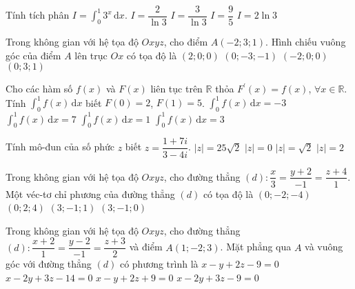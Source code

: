 \begin{ex}%
Tính tích phân $I=\displaystyle \int_{0}^{1} 3^x \mathrm{\, d}x$.
\choice
{\True $I=\dfrac{2}{\ln3}$}
{$I=\dfrac{3}{\ln3}$}
{$I=\dfrac{9}{5}$}
{$I=2\ln3$}
\end{ex}
\begin{ex}%
Trong không gian với hệ tọa độ $Oxyz$, cho điểm $A(-2;3;1)$. Hình chiếu vuông góc của điểm $A$ lên trục $Ox$ có tọa độ là
\choice
{$(2;0;0)$}
{$(0;-3;-1)$}
{\True $(-2;0;0)$}
{$(0;3;1)$}
\end{ex}
\begin{ex}%
Cho các hàm số $f(x)$ và $F(x)$ liên tục trên $\mathbb{R}$ thỏa $F^\prime (x) = f(x)$, $\forall x \in \mathbb{R}$. Tính $\displaystyle \int_{0}^{1} f(x) \mathrm{\, d}x$ biết $F(0)=2$, $F(1)=5$.
\choice
{$\displaystyle \int_{0}^{1} f(x) \mathrm{\, d}x=-3$}
{$\displaystyle \int_{0}^{1} f(x) \mathrm{\, d}x=7$}
{$\displaystyle \int_{0}^{1} f(x) \mathrm{\, d}x=1$}
{\True $\displaystyle \int_{0}^{1} f(x) \mathrm{\, d}x=3$}
\end{ex}
\begin{ex}%
Tính mô-đun của số phức $z$ biết $z=\dfrac{1+7i}{3-4i}$.
\choice
{$|z|=25\sqrt{2}$}
{$|z|=0$}
{\True $|z|=\sqrt{2}$}
{$|z|=2$}
\end{ex}
\begin{ex}%
Trong không gian với hệ tọa độ $Oxyz$, cho đường thẳng $(d)\colon \dfrac{x}{3}=\dfrac{y+2}{-1}=\dfrac{z+4}{1}$. Một véc-tơ chỉ phương của đường thẳng $(d)$ có tọa độ là
\choice
{$(0;-2;-4)$}
{$(0;2;4)$}
{\True $(3;-1;1)$}
{$(3;-1;0)$}
\end{ex}
\begin{ex}%
Trong không gian với hệ tọa độ $Oxyz$, cho đường thẳng $(d)\colon \dfrac{x+2}{1}=\dfrac{y-2}{-1}=\dfrac{z+3}{2}$ và điểm $A(1;-2;3)$. Mặt phẳng qua $A$ và vuông góc với đường thẳng $(d)$ có phương trình là
\choice
{\True $x-y+2z-9=0$}
{$x-2y+3z-14=0$}
{$x-y+2z+9=0$}
{$x-2y+3z-9=0$}
\end{ex}
